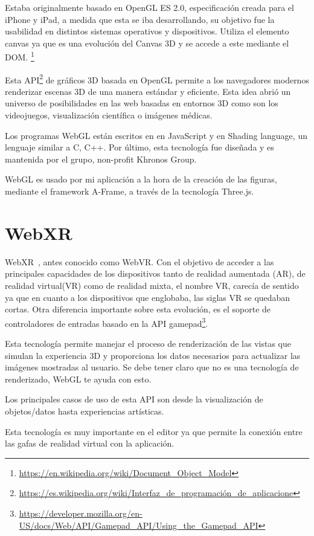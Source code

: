 \documentclass[a4paper, 12pt]{book}
\begin{document}
Estaba originalmente basado en OpenGL ES 2.0, especificación creada para el iPhone y iPad, a medida que esta se iba desarrollando, su objetivo fue la usabilidad en distintos sistemas operativos y dispositivos. Utiliza el elemento canvas ya que es una evolución del Canvas 3D y se accede a este mediante el DOM. \footnote{\url{https://en.wikipedia.org/wiki/Document_Object_Model}}

Esta API\footnote{\url{https://es.wikipedia.org/wiki/Interfaz_de_programación_de_aplicacione}} de gráficos 3D basada en OpenGL permite a los navegadores modernos renderizar escenas 3D de una manera estándar y eficiente. Esta idea abrió un universo de posibilidades en las web basadas en entornos 3D como son los videojuegos, visualización científica o imágenes médicas. 

Los programas WebGL están escritos en en JavaScript y en Shading language, un lenguaje similar a C, C++. Por último, esta tecnología fue diseñada y es mantenida por el grupo, non-profit Khronos Group.

WebGL es usado por mi aplicación a la hora de la creación de las figuras, mediante el framework A-Frame, a través de la tecnología Three.js.

\section{WebXR} %
\label{sec:WebXR}
WebXR~\cite{webXR}, antes conocido como WebVR. Con el objetivo de acceder a las principales capacidades de los dispositivos tanto de realidad aumentada (AR), de realidad virtual(VR) como de realidad mixta, el nombre VR, carecía de sentido ya que en cuanto a los dispositivos que englobaba, las siglas VR se quedaban cortas. Otra diferencia importante sobre esta evolución, es el soporte de controladores de entradas basado en la API gamepad\footnote{\url{https://developer.mozilla.org/en-US/docs/Web/API/Gamepad_API/Using_the_Gamepad_API}}.

Esta tecnología permite manejar el proceso de renderización de las vistas que simulan la experiencia 3D y proporciona los datos necesarios para actualizar las imágenes mostradas al usuario. Se debe tener claro que no es una tecnología de renderizado, WebGL te ayuda con esto.

Los principales casos de uso de esta API son desde la visualización de objetos/datos hasta experiencias artísticas. 

Esta tecnología es muy importante en el editor ya que permite la conexión entre las gafas de realidad virtual con la aplicación.
\end{document}
